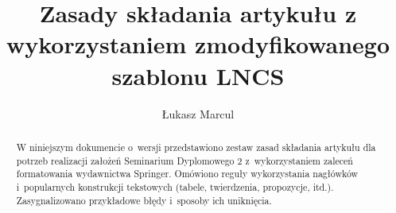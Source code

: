 

\title{Zasady składania artykułu z wykorzystaniem zmodyfikowanego szablonu LNCS}
\author{Łukasz Marcul}



\maketitle

\begin{abstract}
	W niniejszym dokumencie o~wersji przedstawiono zestaw zasad składania artykułu dla potrzeb realizacji założeń Seminarium Dyplomowego 2 z~wykorzystaniem zaleceń formatowania wydawnictwa Springer. Omówiono reguły wykorzystania nagłówków i~popularnych konstrukcji tekstowych (tabele, twierdzenia, propozycje, itd.). Zasygnalizowano przykładowe błędy i~sposoby ich uniknięcia.

\end{abstract}








